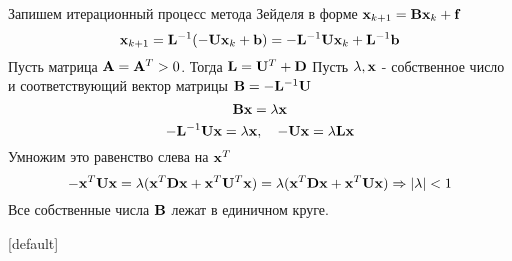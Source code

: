 \documentclass[professionalfonts,compress,unicode]{beamer}
\begin{document}
{
	Запишем итерационный процесс метода Зейделя в форме ${\bf x}_{k+1} = {\bf B} {\bf x}_k + {\bf f}$
	$$
	{\bf x}_{k+1} = {\bf L}^{-1} (-{\bf U} {\bf x}_k + {\bf b}) = -{\bf L}^{-1} {\bf U} {\bf x}_k + {\bf L}^{-1} {\bf b}
	$$
	Пусть матрица ${\bf A} = {\bf A}^T > 0$. Тогда ${\bf L} = {\bf U}^T + {\bf D}$
	Пусть $\lambda, {\bf x}$ - собственное число и соответствующий вектор матрицы ${\bf B} = -{\bf L}^{-1} {\bf U}$
	$$
	{\bf B} {\bf x} = \lambda {\bf x}
	$$
	$$
	-{\bf L}^{-1} {\bf U} {\bf x} = \lambda {\bf x}, \quad -{\bf U} {\bf x} = \lambda {\bf L} {\bf x}
	$$
	Умножим это равенство слева на ${\bf x}^T$
	$$
	-{\bf x}^T {\bf U} {\bf x} = \lambda ({\bf x}^T {\bf D} {\bf x} + {\bf x}^T {\bf U}^T {\bf x}) = \lambda ({\bf x}^T {\bf D} {\bf x} + {\bf x}^T {\bf U} {\bf x}) \Rightarrow | \lambda | < 1
	$$
	Все собственные числа ${\bf B}$ лежат в единичном круге.
}

{
[default] 
}
\end{document}
